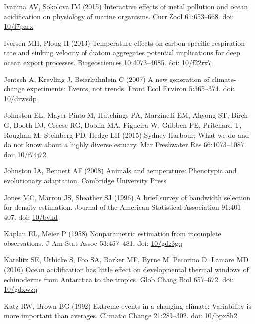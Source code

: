 \documentclass[a4paper,10pt, oneside]{memoir}
\begin{document}
\leavevmode\hypertarget{ref-Ivanina2015}{}%
Ivanina AV, Sokolova IM (2015) Interactive effects of metal pollution and ocean acidification on physiology of marine organisms. Curr Zool 61:653--668. doi: \href{https://doi.org/10/f7pzrx}{10/f7pzrx}

\leavevmode\hypertarget{ref-Iversen2013}{}%
Iversen MH, Ploug H (2013) Temperature effects on carbon-specific respiration rate and sinking velocity of diatom aggregates potential implications for deep ocean export processes. Biogeosciences 10:4073--4085. doi: \href{https://doi.org/10/f22rx7}{10/f22rx7}

\leavevmode\hypertarget{ref-Jentsch2007}{}%
Jentsch A, Kreyling J, Beierkuhnlein C (2007) A new generation of climate-change experiments: Events, not trends. Front Ecol Environ 5:365--374. doi: \href{https://doi.org/10/drwsdp}{10/drwsdp}

\leavevmode\hypertarget{ref-Johnston2015}{}%
Johnston EL, Mayer-Pinto M, Hutchings PA, Marzinelli EM, Ahyong ST, Birch G, Booth DJ, Creese RG, Doblin MA, Figueira W, Gribben PE, Pritchard T, Roughan M, Steinberg PD, Hedge LH (2015) Sydney Harbour: What we do and do not know about a highly diverse estuary. Mar Freshwater Res 66:1073--1087. doi: \href{https://doi.org/10/f74j72}{10/f74j72}

\leavevmode\hypertarget{ref-Johnston2008}{}%
Johnston IA, Bennett AF (2008) Animals and temperature: Phenotypic and evolutionary adaptation. Cambridge University Press

\leavevmode\hypertarget{ref-Jones1996}{}%
Jones MC, Marron JS, Sheather SJ (1996) A brief survey of bandwidth selection for density estimation. Journal of the American Statistical Association 91:401--407. doi: \href{https://doi.org/10/bvkd}{10/bvkd}

\leavevmode\hypertarget{ref-Kaplan1958}{}%
Kaplan EL, Meier P (1958) Nonparametric estimation from incomplete observations. J Am Stat Assoc 53:457--481. doi: \href{https://doi.org/10/gdz3gq}{10/gdz3gq}

\leavevmode\hypertarget{ref-Karelitz2016}{}%
Karelitz SE, Uthicke S, Foo SA, Barker MF, Byrne M, Pecorino D, Lamare MD (2016) Ocean acidification has little effect on developmental thermal windows of echinoderms from Antarctica to the tropics. Glob Chang Biol 657--672. doi: \href{https://doi.org/10/gdxwzq}{10/gdxwzq}

\leavevmode\hypertarget{ref-Katz1992}{}%
Katz RW, Brown BG (1992) Extreme events in a changing climate: Variability is more important than averages. Climatic Change 21:289--302. doi: \href{https://doi.org/10/bpx8h2}{10/bpx8h2}
\end{document}
